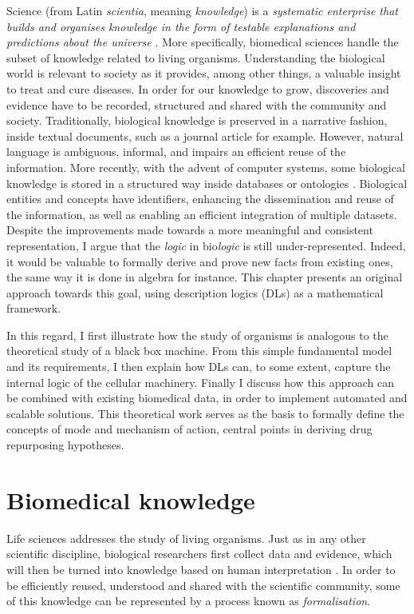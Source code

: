 Science (from Latin \emph{scientia}, meaning \emph{knowledge}) is a \emph{systematic enterprise that builds and organises knowledge in the form of testable explanations and predictions about the universe} \citep{sciencewiki}. More specifically, biomedical sciences handle the subset of knowledge related to living organisms. Understanding the biological world is relevant to society as it provides, among other things, a valuable insight to treat and cure diseases. In order for our knowledge to grow, discoveries and evidence have to be recorded, structured and shared with the community and society. Traditionally, biological knowledge is preserved in a narrative fashion, inside textual documents, such as a journal article for example. However, natural language is ambiguous, informal, and impairs an efficient reuse of the information. More recently, with the advent of computer systems, some biological knowledge is stored in a structured way inside databases or ontologies \citep{brooksbank2014european}. Biological entities and concepts have identifiers, enhancing the dissemination and reuse of the information, as well as enabling an efficient integration of multiple datasets. Despite the improvements made towards a more meaningful and consistent representation, I argue that the \emph{logic} in bio\emph{logic} is still under-represented. Indeed, it would be valuable to formally derive and prove new facts from existing ones, the same way it is done in algebra for instance. This chapter presents an original approach towards this goal, using description logics (DLs) as a mathematical framework.

In this regard, I first illustrate how the study of organisms is analogous to the theoretical study of a black box machine. From this simple fundamental model and its requirements, I then explain how DLs can, to some extent, capture the internal logic of the cellular machinery. Finally I discuss how this approach can be combined with existing biomedical data, in order to implement automated and scalable solutions. This theoretical work serves as the basis to formally define the concepts of mode and mechanism of action, central points in deriving drug repurposing hypotheses.

\section{Biomedical knowledge}

Life sciences addresses the study of living organisms. Just as in any other scientific discipline, biological researchers first collect data and evidence, which will then be turned into knowledge based on human interpretation \citep{antezana2009biological}. In order to be efficiently reused, understood and shared with the scientific community, some of this knowledge can be represented by a process known as \emph{formalisation}.

